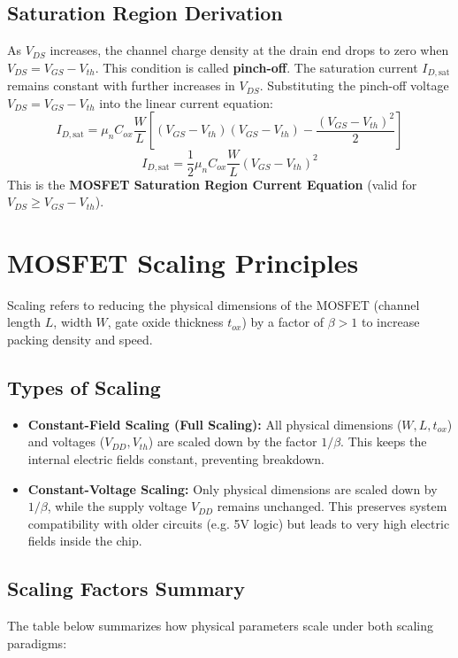 \documentclass[12pt,a4paper]{article}
\begin{document}
\subsection{Saturation Region Derivation}
As $V_{DS}$ increases, the channel charge density at the drain end drops to zero when $V_{DS} = V_{GS} - V_{th}$. This condition is called \textbf{pinch-off}.
The saturation current $I_{D,\text{sat}}$ remains constant with further increases in $V_{DS}$. Substituting the pinch-off voltage $V_{DS} = V_{GS} - V_{th}$ into the linear current equation:
\begin{equation}
  I_{D,\text{sat}} = \mu_n C_{ox} \frac{W}{L} \left[ (V_{GS} - V_{th})(V_{GS} - V_{th}) - \frac{(V_{GS} - V_{th})^2}{2} \right]
\end{equation}
\begin{equation}
  I_{D,\text{sat}} = \frac{1}{2} \mu_n C_{ox} \frac{W}{L} \left( V_{GS} - V_{th} \right)^2
\end{equation}
This is the \textbf{MOSFET Saturation Region Current Equation} (valid for $V_{DS} \ge V_{GS} - V_{th}$).

\section{MOSFET Scaling Principles}

Scaling refers to reducing the physical dimensions of the MOSFET (channel length $L$, width $W$, gate oxide thickness $t_{ox}$) by a factor of $\beta > 1$ to increase packing density and speed.

\subsection{Types of Scaling}
\begin{itemize}[leftmargin=*, itemsep=3.5pt]
  \item \textbf{Constant-Field Scaling (Full Scaling):} All physical dimensions ($W, L, t_{ox}$) and voltages ($V_{DD}, V_{th}$) are scaled down by the factor $1/\beta$. This keeps the internal electric fields constant, preventing breakdown.
  \item \textbf{Constant-Voltage Scaling:} Only physical dimensions are scaled down by $1/\beta$, while the supply voltage $V_{DD}$ remains unchanged. This preserves system compatibility with older circuits (e.g. 5V logic) but leads to very high electric fields inside the chip.
\end{itemize}

\subsection{Scaling Factors Summary}
The table below summarizes how physical parameters scale under both scaling paradigms:
\end{document}
